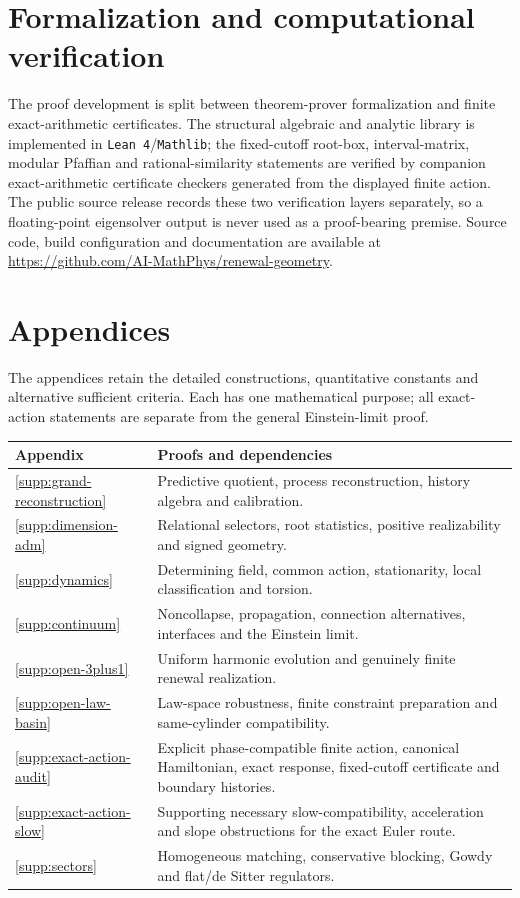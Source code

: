 \documentclass[11pt]{article}
\numberwithin{equation}{section}
\theoremstyle{definition}
\theoremstyle{remark}
\begin{document}
\section*{Formalization and computational verification}
The proof development is split between theorem-prover formalization and
finite exact-arithmetic certificates.  The structural algebraic and analytic
library is implemented in \texttt{Lean~4}/\texttt{Mathlib}; the fixed-cutoff
root-box, interval-matrix, modular Pfaffian and rational-similarity statements
are verified by companion exact-arithmetic certificate checkers generated
from the displayed finite action.  The public source release records these two
verification layers separately, so a floating-point eigensolver output is
never used as a proof-bearing premise.  Source code, build configuration and
documentation are available at
\url{https://github.com/AI-MathPhys/renewal-geometry}.


\clearpage
\appendix
\section*{Appendices}
{}
The appendices retain the detailed constructions, quantitative constants
and alternative sufficient criteria. Each has one mathematical purpose;
all exact-action statements are separate from the general Einstein-limit
proof.
\begin{center}
\small
\begin{tabularx}{\linewidth}{@{}p{.10\linewidth}X@{}}
\toprule
Appendix & Proofs and dependencies\\
\midrule
\ref{supp:grand-reconstruction} & Predictive quotient, process reconstruction, history algebra and calibration.\\
\ref{supp:dimension-adm} & Relational selectors, root statistics, positive realizability and signed geometry.\\
\ref{supp:dynamics} & Determining field, common action, stationarity, local classification and torsion.\\
\ref{supp:continuum} & Noncollapse, propagation, connection alternatives, interfaces and the Einstein limit.\\
\ref{supp:open-3plus1} & Uniform harmonic evolution and genuinely finite renewal realization.\\
\ref{supp:open-law-basin} & Law-space robustness, finite constraint preparation and same-cylinder compatibility.\\
\ref{supp:exact-action-audit} & Explicit phase-compatible finite action, canonical Hamiltonian, exact response, fixed-cutoff certificate and boundary histories.\\
\ref{supp:exact-action-slow} & Supporting necessary slow-compatibility, acceleration and slope obstructions for the exact Euler route.\\
\ref{supp:sectors} & Homogeneous matching, conservative blocking, Gowdy and flat/de Sitter regulators.\\
\bottomrule
\end{tabularx}
\end{center}
\end{document}
